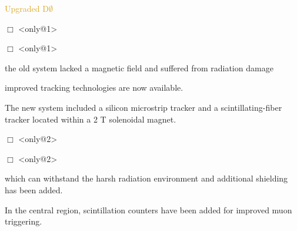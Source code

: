 \begin{frame}{\textcolor{Goldenrod}{Upgraded D$\emptyset$ }}
  \itt
\item[$\Box$]<only@1> 
  
\item[$\Box$]<only@1> 
  {\small
    \itt
  \item \alert{the old system lacked a magnetic field and suffered from radiation
      damage}
  \item improved tracking technologies are now available.\\
  \item The new system included a silicon microstrip tracker and a
    scintillating-fiber tracker located within a 2 T solenoidal
    magnet.
    \tti
  }
\item[$\Box$]<only@2> 
  
\item[$\Box$]<only@2> 
  {\small
    \itt
  \item which can withstand the harsh radiation environment and
    additional shielding has been added.
    
  \item \alert{In the central region,
      scintillation counters have been added for improved muon
      triggering.}
    \tti
  }
  \tti
\end{frame}

